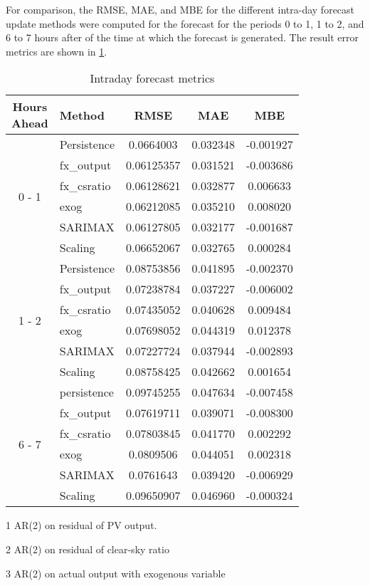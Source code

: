 For comparison, the RMSE, MAE, and MBE for the different intra-day forecast update methods were computed
for the forecast for the periods 0 to 1, 1 to 2, and 6 to 7 hours after of the time at which the forecast is generated.
The result error metrics are shown in \cref{table:intraday-metrics}.

\begin{table}
	\centering
\begin{threeparttable}
	\caption{Intraday forecast metrics}
	\label{table:intraday-metrics}
	\begin{tabular}{clccc}
		\toprule
		\shortstack{Hours\\Ahead} & Method & RMSE & MAE & MBE \\
		\midrule
		\multirow[c]{6}{*}{0 - 1} & Persistence & 0.0664003 & 0.032348 & -0.001927 \\
		& fx\_output\tnote{1} & 0.06125357 & 0.031521 & -0.003686 \\
		& fx\_csratio\tnote{2} & 0.06128621 & 0.032877 & 0.006633 \\
		& exog\tnote{3} & 0.06212085 & 0.035210 & 0.008020 \\
		& SARIMAX & 0.06127805 & 0.032177 & -0.001687 \\
		& Scaling & 0.06652067 & 0.032765 & 0.000284 \\
		\midrule
		\multirow[c]{6}{*}{1 - 2} & Persistence & 0.08753856 & 0.041895 & -0.002370 \\
		& fx\_output\tnote{1} & 0.07238784 & 0.037227 & -0.006002 \\
		& fx\_csratio\tnote{2} & 0.07435052 & 0.040628 & 0.009484 \\
		& exog\tnote{3} & 0.07698052 & 0.044319 & 0.012378 \\
		& SARIMAX & 0.07227724 & 0.037944 & -0.002893 \\
		& Scaling & 0.08758425 & 0.042662 & 0.001654 \\
		\midrule
		\multirow[c]{6}{*}{6 - 7} & persistence & 0.09745255 & 0.047634 & -0.007458 \\
		& fx\_output\tnote{1} & 0.07619711 & 0.039071 & -0.008300 \\
		& fx\_csratio\tnote{2} & 0.07803845 & 0.041770 & 0.002292 \\
		& exog\tnote{3} & 0.0809506 & 0.044051 & 0.002318 \\
		& SARIMAX & 0.0761643 & 0.039420 & -0.006929 \\
		& Scaling & 0.09650907 & 0.046960 & -0.000324 \\
		\bottomrule
	\end{tabular}
	\begin{tablenotes}
		\footnotesize
		\item[1] AR(2) on residual of PV output.
		\item[2] AR(2) on residual of clear-sky ratio
		\item[3] AR(2) on actual output with exogenous variable
	\end{tablenotes}
\end{threeparttable}
\end{table}


